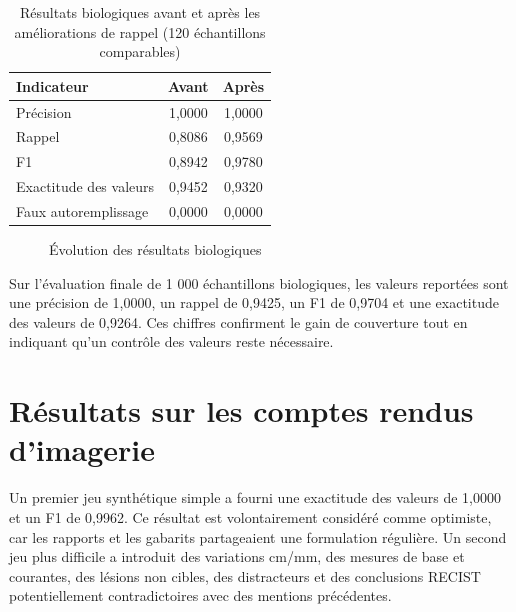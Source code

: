 \begin{table}[H]
\centering
\caption{Résultats biologiques avant et après les améliorations de rappel (120 échantillons comparables)}
\begin{tabular}{lcc}
\toprule
Indicateur & Avant & Après\\
\midrule
Précision & 1,0000 & 1,0000\\
Rappel & 0,8086 & 0,9569\\
F1 & 0,8942 & 0,9780\\
Exactitude des valeurs & 0,9452 & 0,9320\\
Faux autoremplissage & 0,0000 & 0,0000\\
\bottomrule
\end{tabular}
\end{table}

\begin{figure}[H]
\centering
{}
\caption{Évolution des résultats biologiques}
\end{figure}

Sur l'évaluation finale de 1 000 échantillons biologiques, les valeurs reportées sont une précision de 1,0000, un rappel de 0,9425, un F1 de 0,9704 et une exactitude des valeurs de 0,9264. Ces chiffres confirment le gain de couverture tout en indiquant qu'un contrôle des valeurs reste nécessaire.

\section{Résultats sur les comptes rendus d'imagerie}
Un premier jeu synthétique simple a fourni une exactitude des valeurs de 1,0000 et un F1 de 0,9962. Ce résultat est volontairement considéré comme optimiste, car les rapports et les gabarits partageaient une formulation régulière. Un second jeu plus difficile a introduit des variations cm/mm, des mesures de base et courantes, des lésions non cibles, des distracteurs et des conclusions RECIST potentiellement contradictoires avec des mentions précédentes.

